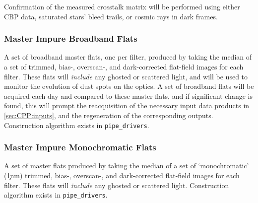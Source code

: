 Confirmation of the measured crosstalk matrix will be performed using either CBP data, saturated stars' bleed trails, or cosmic rays in dark frames\citep{2012PASP..124.1347Y}.


\subsubsection{Master Impure Broadband Flats}\label{sec:CPP:output:BroadbandImpureFlat}
A set of broadband master flats, one per filter, produced by taking the median of a set of trimmed, bias-, overscan-, and dark-corrected flat-field images for each filter. These flats will \emph{include} any ghosted or scattered light, and will be used to monitor the evolution of dust spots \etc on the optics. A set of broadband flats will be acquired each day and compared to these master flats, and if significant change is found, this will prompt the reacquisition of the necessary input data products in \secsymbol\ref{sec:CPP:inputs}, and the regeneration of the corresponding outputs.
\alg Construction algorithm exists in \texttt{pipe\_drivers}.


\subsubsection{Master Impure Monochromatic Flats}\label{sec:CPP:output:monoFlat}
A set of master flats produced by taking the median of a set of `monochromatic' (\c 1nm) trimmed, bias-, overscan-, and dark-corrected flat-field images for each filter. These flats will \emph{include} any ghosted or scattered light.
\alg Construction algorithm exists in \texttt{pipe\_drivers}.


